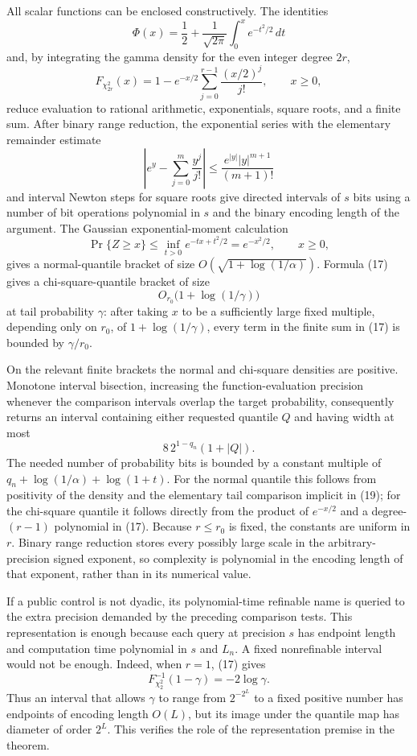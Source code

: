 All scalar functions can be enclosed constructively. The identities
\[
\Phi(x)=\frac12+\frac1{\sqrt{2\pi}}
\int_0^x e^{-t^2/2}\,dt
\tag{16}
\]
and, by integrating the gamma density for the even integer degree \(2r\),
\[
F_{\chi^2_{2r}}(x)
=1-e^{-x/2}\sum_{j=0}^{r-1}\frac{(x/2)^j}{j!},
\qquad x\ge0,
\tag{17}
\]
reduce evaluation to rational arithmetic, exponentials, square roots, and a finite sum. After binary range reduction, the exponential series with the elementary remainder estimate
\[
\left|e^y-\sum_{j=0}^{m}\frac{y^j}{j!}\right|
\le \frac{e^{|y|}|y|^{m+1}}{(m+1)!}
\tag{18}
\]
and interval Newton steps for square roots give directed intervals of \(s\) bits using a number of bit operations polynomial in \(s\) and the binary encoding length of the argument. The Gaussian exponential-moment calculation
\[
\Pr\{Z\ge x\}
\le\inf_{t>0}e^{-tx+t^2/2}=e^{-x^2/2},
\qquad x\ge0,
\tag{19}
\]
gives a normal-quantile bracket of size \(O(\sqrt{1+\log(1/\alpha)})\). Formula (17) gives a chi-square-quantile bracket of size
\[
O_{r_0}\bigl(1+\log(1/\gamma)\bigr)
\tag{20}
\]
at tail probability \(\gamma\): after taking \(x\) to be a sufficiently large fixed multiple, depending only on \(r_0\), of \(1+\log(1/\gamma)\), every term in the finite sum in (17) is bounded by \(\gamma/r_0\).

On the relevant finite brackets the normal and chi-square densities are positive. Monotone interval bisection, increasing the function-evaluation precision whenever the comparison intervals overlap the target probability, consequently returns an interval containing either requested quantile \(Q\) and having width at most
\[
8\,2^{1-q_n}(1+|Q|).
\tag{21}
\]
The needed number of probability bits is bounded by a constant multiple of \(q_n+\log(1/\alpha)+\log(1+t)\). For the normal quantile this follows from positivity of the density and the elementary tail comparison implicit in (19); for the chi-square quantile it follows directly from the product of \(e^{-x/2}\) and a degree-\((r-1)\) polynomial in (17). Because \(r\le r_0\) is fixed, the constants are uniform in \(r\). Binary range reduction stores every possibly large scale in the arbitrary-precision signed exponent, so complexity is polynomial in the encoding length of that exponent, rather than in its numerical value.

If a public control is not dyadic, its polynomial-time refinable name is queried to the extra precision demanded by the preceding comparison tests. This representation is enough because each query at precision \(s\) has endpoint length and computation time polynomial in \(s\) and \(L_n\). A fixed nonrefinable interval would not be enough. Indeed, when \(r=1\), (17) gives
\[
F_{\chi^2_2}^{-1}(1-\gamma)=-2\log\gamma.
\tag{22}
\]
Thus an interval that allows \(\gamma\) to range from \(2^{-2^L}\) to a fixed positive number has endpoints of encoding length \(O(L)\), but its image under the quantile map has diameter of order \(2^L\). This verifies the role of the representation premise in the theorem.

